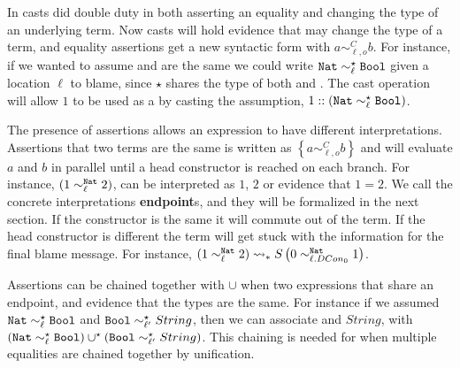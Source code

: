
In  casts did double duty in both asserting an equality and changing the type of an underlying term.
Now casts will hold evidence that may change the type of a term, and equality assertions get a new syntactic form with $a\sim_{\ell,o}^{C}b$.
For instance, if we wanted to assume \Nat{} and \Bool{} are the same we could write $\mathtt{Nat}{} \sim_{\ell}^{\star}\mathtt{Bool}{} $ given a location $\ell$ to blame, since $\star$ shares the type of both \Nat{} and \Bool{}.
The cast operation will allow $1$ to be used as a \Bool{} by casting the assumption, $1::\left(\mathtt{Nat}{} \sim_{\ell}^{\star}\mathtt{Bool}{} \right)$.

The presence of assertions allows an expression to have different interpretations.
Assertions that two terms are the same is written as $\left\{ a\sim_{\ell,o}^{C}b\right\}$ and will evaluate $a$ and $b$ in parallel until a head constructor is reached on each branch. 
For instance, $\left(1 \sim_{\ell}^{\mathtt{Nat}{}} 2 \right)$, can be interpreted as $1$, $2$ or evidence that $1=2$.
We call the concrete interpretations \textbf{endpoint}s, and they will be formalized in the next section.
If the constructor is the same it will commute out of the term.
If the head constructor is different the term will get stuck with the information for the final blame message.
For instance, $\left(1 \sim_{\ell}^{\mathtt{Nat}{}} 2 \right)\rightsquigarrow_{*} S\left(0 \sim_{\ell.DCon_{0}}^{\mathtt{Nat}{}} 1\right) $.


Assertions can be chained together with $\cup$ when two expressions that share an endpoint, and evidence that the types are the same.
For instance if we assumed $\mathtt{Nat}{} \sim_{\ell}^{\star}\mathtt{Bool}{} $ and $\mathtt{Bool}{} \sim_{\ell'}^{\star}String$, then we can associate \Nat{} and $String$, with $\left(\mathtt{Nat}{} \sim_{\ell}^{\star}\mathtt{Bool}{} \right)\cup^{\star}\left(\mathtt{Bool}{} \sim_{\ell'}^{\star}String\right)$.
This chaining is needed for when multiple equalities are chained together by unification.


